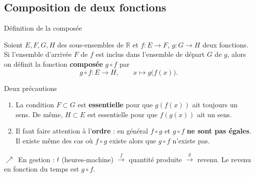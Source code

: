 \documentclass[aspectratio=169,11pt]{beamer}
\providecommand{\faChartLine}{$\nearrow$}
\newcommand{\R}{\mathbb{R}}
\newcommand{\key}[1]{\textbf{\color{DarkBlue}#1}}
\newcommand{\important}[1]{\textbf{\color{DarkRed}#1}}
\newcommand{\fonc}[3]{#1\colon #2\to #3}
\begin{document}
\subsection{Composition de deux fonctions}

\begin{frame}{Définition de la composée}
	\begin{definitionbox}
		Soient $E,F,G,H$ des sous-ensembles de $\R$ et $\fonc{f}{E}{F}$, $\fonc{g}{G}{H}$
		deux fonctions. Si l'ensemble d'arrivée $F$ de $f$ est inclus dans l'ensemble
		de départ $G$ de $g$, alors on définit la fonction \key{composée} $g\circ f$ par
		\[
			g\circ f \colon E \longrightarrow H, \qquad
			x \longmapsto g\bigl(f(x)\bigr).
		\]
	\end{definitionbox}
	\vspace{0.2cm}
	\centering
\end{frame}

\begin{frame}{Deux précautions}
	\begin{attentionbox}
		\begin{enumerate}
			\item La condition $F\subset G$ est \important{essentielle} pour que $g(f(x))$ ait
			toujours un sens. De même, $H\subset E$ est essentielle pour que $f(g(x))$ ait un sens.
			\item Il faut faire attention à l'\key{ordre} : en général $f\circ g$ et $g\circ f$
			\important{ne sont pas égales}. Il existe même des cas où $f\circ g$ existe
			alors que $g\circ f$ n'existe pas.
		\end{enumerate}
	\end{attentionbox}
	\vspace{0.25cm}
	\begin{applicationbox}
		\faChartLine\ En gestion : $t$ (heures-machine) $\xrightarrow{f}$ quantité produite
		$\xrightarrow{g}$ revenu. Le revenu en fonction du temps est $g\circ f$.
	\end{applicationbox}
\end{frame}
\end{document}
